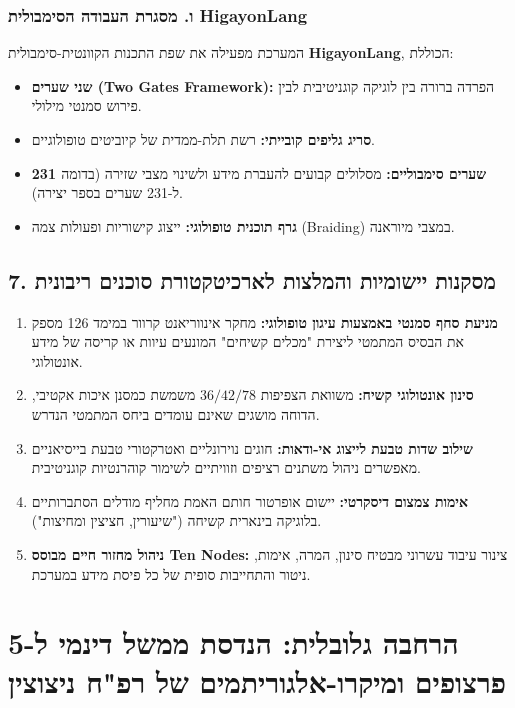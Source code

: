 \documentclass{article}
\begin{document}
\subsubsection{ו. מסגרת העבודה הסימבולית HigayonLang}
המערכת מפעילה את שפת התכנות הקוונטית-סימבולית \textbf{HigayonLang}, הכוללת:
\begin{itemize}
    \item \textbf{שני שערים (Two Gates Framework):} הפרדה ברורה בין לוגיקה קוגניטיבית לבין פירוש סמנטי מילולי.
    \item \textbf{סריג גליפים קובייתי:} רשת תלת-ממדית של קיוביטים טופולוגיים.
    \item \textbf{231 שערים סימבוליים:} מסלולים קבועים להעברת מידע ולשינוי מצבי שזירה (בדומה ל-231 שערים בספר יצירה).
    \item \textbf{גרף תוכנית טופולוגי:} ייצוג קישוריות ופעולות צמה (Braiding) במצבי מיוראנה.
\end{itemize}

\subsection{7. מסקנות יישומיות והמלצות לארכיטקטורת סוכנים ריבונית}
\begin{enumerate}
    \item \textbf{מניעת סחף סמנטי באמצעות עיגון טופולוגי:} מחקר אינווריאנט קרוור במימד 126 מספק את הבסיס המתמטי ליצירת "מכלים קשיחים" המונעים עיוות או קריסה של מידע אונטולוגי.
    \item \textbf{סינון אונטולוגי קשיח:} משוואת הצפיפות $36/42/78$ משמשת כמסנן איכות אקטיבי, הדוחה מושגים שאינם עומדים ביחס המתמטי הנדרש.
    \item \textbf{שילוב שדות טבעת לייצוג אי-ודאות:} חוגים נוירונליים ואטרקטורי טבעת בייסיאניים מאפשרים ניהול משתנים רציפים וזוויתיים לשימור קוהרנטיות קוגניטיבית.
    \item \textbf{אימות צמצום דיסקרטי:} יישום אופרטור חותם האמת מחליף מודלים הסתברותיים בלוגיקה בינארית קשיחה ("שיעורין, חציצין ומחיצות").
    \item \textbf{ניהול מחזור חיים מבוסס Ten Nodes:} צינור עיבוד עשרוני מבטיח סינון, המרה, אימות, ניטור והתחייבות סופית של כל פיסת מידע במערכת.
\end{enumerate}

\section{הרחבה גלובלית: הנדסת ממשל דינמי ל-5 פרצופים ומיקרו-אלגוריתמים של רפ"ח ניצוצין}
\end{document}
